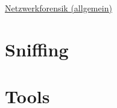 \raggedright
\footnotesize
\begin{multicols}{3}	
	\setlength{\premulticols}{1pt}
	\setlength{\postmulticols}{1pt}
	\setlength{\multicolsep}{1pt}
	\setlength{\columnsep}{2pt}

\begin{center}
     \Large{\underline{Netzwerkforensik (allgemein)}} \\
\end{center}

\section{Sniffing}
\lipsum[1-2]
\section{Tools}
\lipsum[1-2]

\end{multicols}